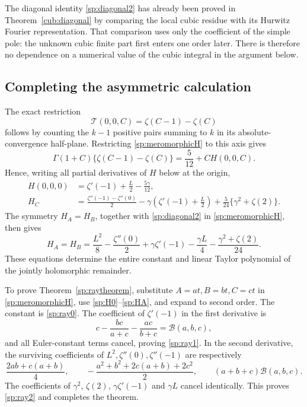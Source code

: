 The diagonal identity \eqref{sp:diagonal2} has already been proved in
Theorem~\ref{cub:diagonal} by comparing the local cubic residue with
its Hurwitz Fourier representation. That comparison uses only the
coefficient of the simple pole: the unknown cubic finite part first
enters one order later. There is therefore no dependence on a numerical
value of the cubic integral in the argument below.

\subsection{Completing the asymmetric calculation}

The exact restriction
\begin{equation}\label{sp:axis}
 \mathcal T(0,0,C)=\zeta(C-1)-\zeta(C)
\end{equation}
follows by counting the $k-1$ positive pairs summing to $k$ in its
absolute-convergence half-plane.  Restricting
\eqref{sp:meromorphicH} to this axis gives
\[
 \Gamma(1+C)\{\zeta(C-1)-\zeta(C)\}
       =\frac5{12}+C H(0,0,C).
\]
Hence, writing all partial derivatives of $H$ below at the origin,
\begin{align}
 H(0,0,0)
   &=\zeta'(-1)+\frac L2-\frac{5\gamma}{12},\label{sp:H0}\\
 H_C
   &=\frac{\zeta''(-1)-\zeta''(0)}2
       -\gamma\left(\zeta'(-1)+\frac L2\right)
       +\frac5{24}\{\gamma^2+\zeta(2)\}.
       \label{sp:HC}
\end{align}
The symmetry $H_A=H_B$, together with \eqref{sp:diagonal2} in
\eqref{sp:meromorphicH}, then gives
\begin{equation}\label{sp:HA}
 H_A=H_B=\frac{L^2}{8}-\frac{\zeta''(0)}2
         +\gamma\zeta'(-1)-\frac{\gamma L}{4}
         -\frac{\gamma^2+\zeta(2)}{24}.
\end{equation}
These equations determine the entire constant and linear Taylor
polynomial of the jointly holomorphic remainder.

To prove Theorem~\ref{sp:raytheorem}, substitute
$A=at,B=bt,C=ct$ in \eqref{sp:meromorphicH}, use
\eqref{sp:H0}--\eqref{sp:HA}, and expand to second order.  The
constant is \eqref{sp:ray0}.  The coefficient of $\zeta'(-1)$ in
the first derivative is
\[
 c-\frac{bc}{a+c}-\frac{ac}{b+c}
       =\mathcal B(a,b,c),
\]
and all Euler-constant terms cancel, proving \eqref{sp:ray1}.
In the second derivative, the surviving coefficients of
$L^2,\zeta''(0),\zeta''(-1)$ are respectively
\[
 \frac{2ab+c(a+b)}4,\qquad
 -\frac{a^2+b^2+2c(a+b)+2c^2}{2},\qquad
 (a+b+c)\mathcal B(a,b,c).
\]
The coefficients of $\gamma^2$, $\zeta(2)$,
$\gamma\zeta'(-1)$ and $\gamma L$ cancel identically.  This proves
\eqref{sp:ray2} and completes the theorem.

